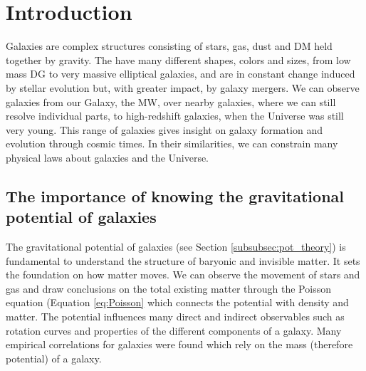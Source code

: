 \section{Introduction}\label{sec:Intro}
Galaxies are complex structures consisting of stars, gas, dust and \ac{DM} held together by gravity. The have many different shapes, colors and sizes, from low mass \ac{DG} to very massive elliptical galaxies, and are in constant change induced by stellar evolution but, with greater impact, by galaxy mergers. We can observe galaxies from our Galaxy, the \ac{MW}, over nearby galaxies, where we can still resolve individual parts, to high-redshift galaxies, when the Universe was still very young. This range of galaxies gives insight on galaxy formation and evolution through cosmic times. In their similarities, we can constrain many physical laws about galaxies and the Universe. 

\subsection{The importance of knowing the gravitational potential of galaxies}
The gravitational potential of galaxies (see Section \ref{subsubsec:pot_theory}) is fundamental to understand the structure of baryonic and invisible matter. It sets the foundation on how matter moves. We can observe the movement of stars and gas and draw conclusions on the total existing matter through the Poisson equation (Equation \ref{eq:Poisson} which connects the potential with density and matter. The potential influences many direct and indirect observables such as rotation curves and properties of the different components of a galaxy. Many empirical correlations for galaxies were found which rely on the mass (therefore potential) of a galaxy. 

